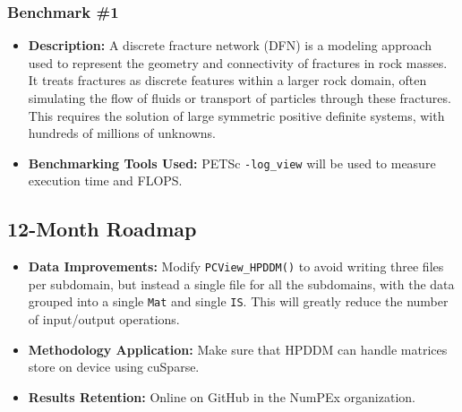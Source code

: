 \subsubsection{Benchmark \#1}
\begin{itemize}
    \item \textbf{Description:} A discrete fracture network (DFN) is a modeling approach used to represent the geometry and connectivity of fractures in rock masses. It treats fractures as discrete features within a larger rock domain, often simulating the flow of fluids or transport of particles through these fractures. This requires the solution of large symmetric positive definite systems, with hundreds of millions of unknowns.
    \item \textbf{Benchmarking Tools Used:} PETSc \verb!-log_view! will be used to measure execution time and FLOPS.
\end{itemize}

\subsection{12-Month Roadmap}
\label{sec:WP3:HPDDM:roadmap}

\begin{itemize}
    \item \textbf{Data Improvements:} Modify \verb!PCView_HPDDM()! to avoid writing three files per subdomain, but instead a single file for all the subdomains, with the data grouped into a single \verb!Mat! and single \verb!IS!. This will greatly reduce the number of input/output operations.
    \item \textbf{Methodology Application:} Make sure that HPDDM can handle matrices store on device using cuSparse.
    \item \textbf{Results Retention:} Online on GitHub in the NumPEx organization.
\end{itemize}

